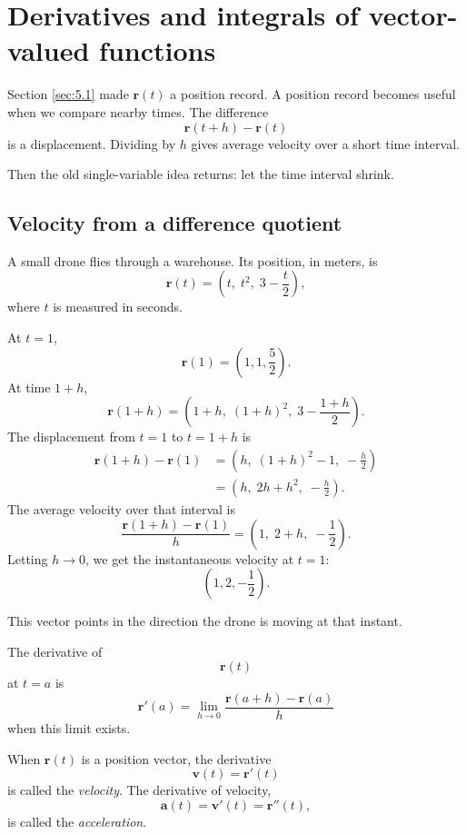 \section{Derivatives and integrals of vector-valued functions}
\label{sec:5.2}

Section \ref{sec:5.1} made \(\mathbf r(t)\) a position record.  A position record becomes
useful when we compare nearby times.  The difference
\[
    \mathbf r(t+h)-\mathbf r(t)
\]
is a displacement.  Dividing by \(h\) gives average velocity over a short time interval.

Then the old single-variable idea returns: let the time interval shrink.

\subsection{Velocity from a difference quotient}

A small drone flies through a warehouse.  Its position, in meters, is
\[
    \mathbf r(t)=\left(t,\;t^2,\;3-\frac{t}{2}\right),
\]
where \(t\) is measured in seconds.

At \(t=1\),
\[
    \mathbf r(1)=\left(1,1,\frac52\right).
\]
At time \(1+h\),
\[
    \mathbf r(1+h)=
    \left(1+h,\;(1+h)^2,\;3-\frac{1+h}{2}\right).
\]
The displacement from \(t=1\) to \(t=1+h\) is
\[
\begin{aligned}
    \mathbf r(1+h)-\mathbf r(1)
    &=
    \left(
        h,\;
        (1+h)^2-1,\;
        -\frac{h}{2}
    \right)\\
    &=
    \left(
        h,\;
        2h+h^2,\;
        -\frac{h}{2}
    \right).
\end{aligned}
\]
The average velocity over that interval is
\[
\frac{\mathbf r(1+h)-\mathbf r(1)}{h}
=
\left(
    1,\;
    2+h,\;
    -\frac12
\right).
\]
Letting \(h\to0\), we get the instantaneous velocity at \(t=1\):
\[
    \left(1,2,-\frac12\right).
\]

This vector points in the direction the drone is moving at that instant.

\begin{definition}
The derivative of
\[
    \mathbf r(t)
\]
at \(t=a\) is
\[
\boxed{
    \mathbf r'(a)=
    \lim_{h\to0}
    \frac{\mathbf r(a+h)-\mathbf r(a)}{h}
}
\]
when this limit exists.
\end{definition}

When \(\mathbf r(t)\) is a position vector, the derivative
\[
    \mathbf v(t)=\mathbf r'(t)
\]
is called the \emph{velocity}.  The derivative of velocity,
\[
    \mathbf a(t)=\mathbf v'(t)=\mathbf r''(t),
\]
is called the \emph{acceleration}.

